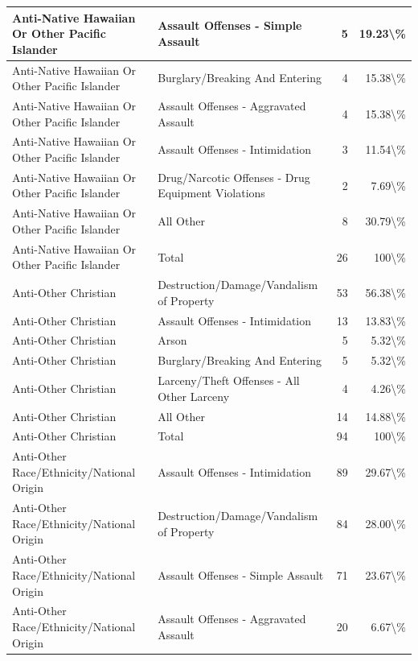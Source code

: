 \documentclass[
]{krantz}
\begin{document}
\begin{longtable}[t]{l|l|r|r}
\hline
Anti-Native Hawaiian Or Other Pacific Islander & Assault Offenses - Simple Assault & 5 & 19.23\textbackslash{}\%\\
\hline
Anti-Native Hawaiian Or Other Pacific Islander & Burglary/Breaking And Entering & 4 & 15.38\textbackslash{}\%\\
\hline
Anti-Native Hawaiian Or Other Pacific Islander & Assault Offenses - Aggravated Assault & 4 & 15.38\textbackslash{}\%\\
\hline
Anti-Native Hawaiian Or Other Pacific Islander & Assault Offenses - Intimidation & 3 & 11.54\textbackslash{}\%\\
\hline
Anti-Native Hawaiian Or Other Pacific Islander & Drug/Narcotic Offenses - Drug Equipment Violations & 2 & 7.69\textbackslash{}\%\\
\hline
Anti-Native Hawaiian Or Other Pacific Islander & All Other & 8 & 30.79\textbackslash{}\%\\
\hline
Anti-Native Hawaiian Or Other Pacific Islander & Total & 26 & 100\textbackslash{}\%\\
\hline
Anti-Other Christian & Destruction/Damage/Vandalism of Property & 53 & 56.38\textbackslash{}\%\\
\hline
Anti-Other Christian & Assault Offenses - Intimidation & 13 & 13.83\textbackslash{}\%\\
\hline
Anti-Other Christian & Arson & 5 & 5.32\textbackslash{}\%\\
\hline
Anti-Other Christian & Burglary/Breaking And Entering & 5 & 5.32\textbackslash{}\%\\
\hline
Anti-Other Christian & Larceny/Theft Offenses - All Other Larceny & 4 & 4.26\textbackslash{}\%\\
\hline
Anti-Other Christian & All Other & 14 & 14.88\textbackslash{}\%\\
\hline
Anti-Other Christian & Total & 94 & 100\textbackslash{}\%\\
\hline
Anti-Other Race/Ethnicity/National Origin & Assault Offenses - Intimidation & 89 & 29.67\textbackslash{}\%\\
\hline
Anti-Other Race/Ethnicity/National Origin & Destruction/Damage/Vandalism of Property & 84 & 28.00\textbackslash{}\%\\
\hline
Anti-Other Race/Ethnicity/National Origin & Assault Offenses - Simple Assault & 71 & 23.67\textbackslash{}\%\\
\hline
Anti-Other Race/Ethnicity/National Origin & Assault Offenses - Aggravated Assault & 20 & 6.67\textbackslash{}\%\\

\end{longtable}
\end{document}
